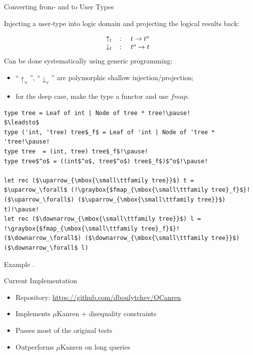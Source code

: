 \documentclass[10pt, mathserif]{beamer}
\let\\\tabularnewline
\let\\\tabularnewline
\newcommand{\oo}[1]{{#1}^o}
\newcommand{\graybox}[1]{\colorbox{light-gray}{#1}}
\theoremstyle{definition}
\begin{document}
\begin{frame}[fragile]{Converting from- and to User Types}

\small
Injecting a user-type into logic domain and projecting the
logical results back:

$$
\begin{array}{rcl}
\uparrow_t&\colon &t \to \oo{t}\\
\downarrow_t&\colon& \oo{t} \to t
\end{array}
$$
\pause
Can be done systematically using generic programming:

\begin{itemize}
\item ``$\uparrow_\forall$'', ``$\downarrow_\forall$'' are polymorphic shallow injection/projection;
\item for the deep case, make the type a functor and use $fmap$.
\end{itemize}
\pause
\begin{lstlisting}[mathescape=true]
type tree = Leaf of int | Node of tree * tree!\pause!
$\leadsto$
type ('int, 'tree) tree$_f$ = Leaf of 'int | Node of 'tree * 'tree!\pause!
type tree  = (int, tree) tree$_f$!\pause!
type tree$^o$ = ((int$^o$, tree$^o$) tree$_f$)$^o$!\pause!

let rec ($\uparrow_{\mbox{\small\ttfamily tree}}$) t = $\uparrow_\forall$ (!\graybox{$fmap_{\mbox{\small\ttfamily tree}_f}$}! ($\uparrow_\forall$) ($\uparrow_{\mbox{\small\ttfamily tree}}$) t)!\pause!
let rec ($\downarrow_{\mbox{\small\ttfamily tree}}$) l = !\graybox{$fmap_{\mbox{\small\ttfamily tree}_f}$}! ($\downarrow_\forall$) ($\downarrow_{\mbox{\small\ttfamily tree}}$) ($\downarrow_\forall$ l)

\end{lstlisting}
\end{frame}

\begin{frame}[fragile]{Example}
.
\end{frame}

\begin{frame}[fragile]{Current Implementation}
\begin{itemize}
\item Repository: \url{https://github.com/dboulytchev/OCanren}
\item Implements $\mu$Kanren + disequality constraints
\item Passes most of the original tests
\item Outperforms $\mu$Kanren on long queries
\end{itemize}

\end{frame}
\end{document}
